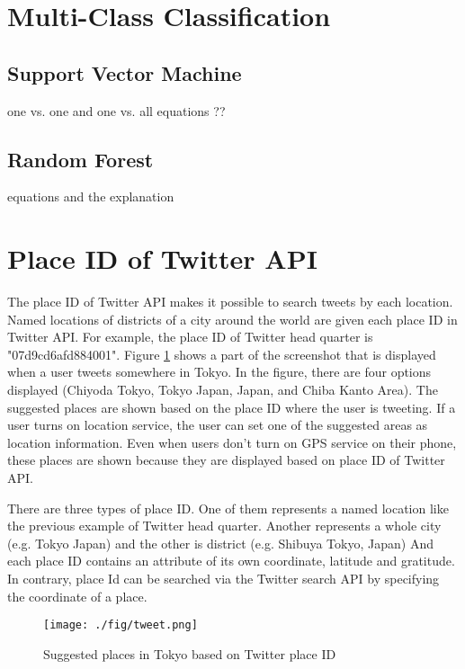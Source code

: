 \section{Multi-Class Classification} 
\subsection{Support Vector Machine}
one vs. one and one vs. all
equations ??
\subsection{Random Forest}
equations and the explanation

\section{Place ID of Twitter API}
The place ID of Twitter API \cite{twitter_api_placeid} makes it possible to search tweets by each location. 
Named locations of districts of a city around the world are given each place ID in Twitter API.
For example, the place ID of Twitter head quarter is "07d9cd6afd884001".
Figure \ref{fig:tweet} shows a part of the screenshot that is displayed when a user tweets somewhere in Tokyo.
In the figure, there are four options displayed (Chiyoda Tokyo, Tokyo Japan, Japan, and Chiba Kanto Area).
The suggested places are shown based on the place ID where the user is tweeting.
If a user turns on location service, the user can set one of the suggested areas as location information. 
Even when users don't turn on GPS service on their phone, these places are shown because they are displayed based on place ID of Twitter API.

There are three types of place ID.
One of them represents a named location like the previous example of Twitter head quarter.
Another represents a whole city (e.g. Tokyo Japan) and the other is district (e.g. Shibuya Tokyo, Japan)
And each place ID contains an attribute of its own coordinate, latitude and gratitude.
In contrary, place Id can be searched via the Twitter search API by specifying the coordinate of a place.


\begin{figure}
	\centering
	\texttt{[image: ./fig/tweet.png]}
	\caption{Suggested places in Tokyo based on Twitter place ID}
	\label{fig:tweet}
\end{figure}

